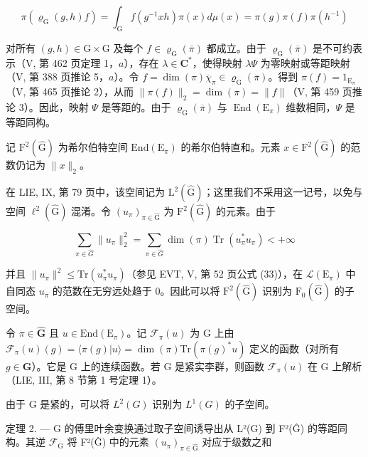 \[
\pi (\varrho_ {\mathrm{G}} (g, h) f) = \int_ {\mathrm{G}} f (g ^ {- 1} x h) \pi (x) d \mu (x) = \pi (g) \pi (f) \pi (h ^ {- 1})
\]

对所有 \((g,h)\in\mathrm{G}\times\mathrm{G}\) 及每个 \(f\in\varrho_{\mathrm{G}}(\overline{\pi})\) 都成立。由于 \(\varrho_{\mathrm{G}}(\overline{\pi})\) 是不可约表示（V, 第 462 页定理 1，\(a\)），存在 \(\lambda\in\mathbf{C}^{*}\)，使得映射 \(\lambda\Psi\) 为零映射或等距映射（V, 第 388 页推论 5，\(a\)）。令 \(f=\dim(\pi)\overline{\chi}_{\pi}\in\varrho_{\mathrm{G}}(\overline{\pi})\)。得到 \(\pi(f)=1_{\mathrm{E}_{\pi}}\)（V, 第 465 页推论 2），从而 \(\|\pi(f)\|_{2}=\dim(\pi)=\|f\|\)（V, 第 459 页推论 3）。因此，映射 \(\Psi\) 是等距的。由于 \(\varrho_{\mathrm{G}}(\overline{\pi})\) 与 \(\operatorname{End}(\mathrm{E}_{\pi})\) 维数相同，\(\Psi\) 是等距同构。

记 \(\mathrm{F}^{2}(\widehat{\mathrm{G}})\) 为希尔伯特空间 \(\mathrm{End}(\mathrm{E}_{\pi})\) 的希尔伯特直和。元素 \(x \in \mathrm{F}^{2}(\widehat{\mathrm{G}})\) 的范数仍记为 \(\|x\|_{2}\)。

在 LIE, IX, 第 79 页中，该空间记为 \(\mathrm{L}^{2}(\widehat{\mathrm{G}})\)；这里我们不采用这一记号，以免与空间 \(\ell^{2}(\widehat{\mathrm{G}})\) 混淆。令 \((u_{\pi})_{\pi\in\widehat{\mathrm{G}}}\) 为 \(\mathrm{F}^{2}(\widehat{\mathrm{G}})\) 的元素。由于

\[
\sum_ {\pi \in \widehat {G}} \| u _ {\pi} \| _ {2} ^ {2} = \sum_ {\pi \in \widehat {G}} \dim (\pi) \operatorname{Tr} (u _ {\pi} ^ {*} u _ {\pi}) <   + \infty
\]

并且 \(\|u_{\pi}\|^{2}\leqslant\mathrm{Tr}(u_{\pi}^{*}u_{\pi})\)（参见 EVT, V, 第 52 页公式 (33)），在 \(\mathcal{L}(\mathrm{E}_{\pi})\) 中自同态 \(u_{\pi}\) 的范数在无穷远处趋于 0。因此可以将 \(\mathrm{F}^{2}(\widehat{\mathrm{G}})\) 识别为 \(\mathrm{F}_{0}(\widehat{\mathrm{G}})\) 的子空间。

令 \(\pi \in \widehat{\mathbf{G}}\) 且 \(u \in \mathrm{End}(\mathrm{E}_{\pi})\)。记 \(\mathcal{F}_{\pi}(u)\) 为 G 上由 \(\mathcal{F}_{\pi}(u)(g) = \langle \pi(g) | u \rangle = \dim(\pi) \mathrm{Tr}(\pi(g)^{*} u)\) 定义的函数（对所有 \(g \in \mathbf{G}\)）。它是 G 上的连续函数。若 G 是紧实李群，则函数 \(\mathcal{F}_{\pi}(u)\) 在 G 上解析（LIE, III, 第 8 节第 1 号定理 1）。

由于 G 是紧的，可以将 \(L^{2}(G)\) 识别为 \(L^{1}(G)\) 的子空间。

定理 2. --- G 的傅里叶余变换通过取子空间诱导出从 L²(G) 到 F²(Ĝ) 的等距同构。其逆 \(\mathcal{F}_{\mathrm{G}}\) 将 F²(Ĝ) 中的元素 \((u_{\pi})_{\pi \in \widehat{\mathrm{G}}}\) 对应于级数之和

